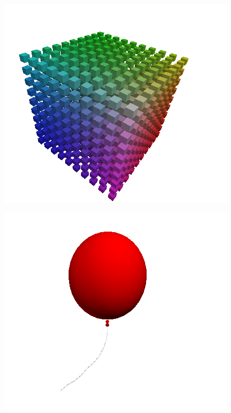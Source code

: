 

\centerline{\includegraphics[scale=0.40]{../imagenes/eg22.png}}




\centerline{\includegraphics[scale=0.40]{../imagenes/eg23.png}}





